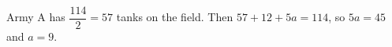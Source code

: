 Army A has $\dfrac{114}2=57$ tanks on the field. Then $57+12+5a=114$, so $5a=45$ and $a=\boxed{9}$.
